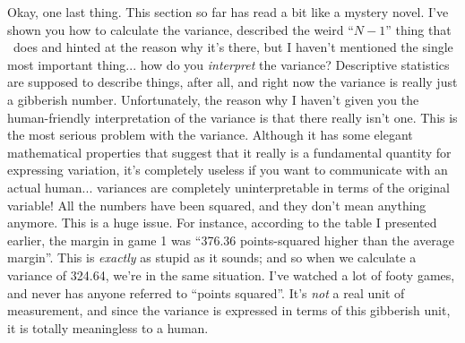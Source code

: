 Okay, one last thing. This section so far has read a bit like a mystery novel. I've shown you how to calculate the variance, described the weird ``$N-1$'' thing that \R\ does and hinted at the reason why it's there, but I haven't mentioned the single most important thing... how do you {\it interpret} the variance? Descriptive statistics are supposed to describe things, after all, and right now the variance is really just a gibberish number. Unfortunately, the reason why I haven't given you the human-friendly interpretation of the variance is that there really isn't one. This is the most serious problem with the variance. Although it has some elegant mathematical properties that suggest that it really is a fundamental quantity for expressing variation, it's completely useless if you want to communicate with an actual human... variances are completely uninterpretable in terms of the original variable! All the numbers have been squared, and they don't mean anything anymore. This is a huge issue. For instance, according to the table I presented earlier, the margin in game 1 was ``376.36 points-squared higher than the average margin''. This is {\it exactly} as stupid as it sounds; and so when we calculate a variance of 324.64, we're in the same situation. I've watched a lot of footy games, and never has anyone referred to ``points squared''. It's {\it not} a real unit of measurement, and since the variance is expressed in terms of this gibberish unit, it is totally meaningless to a human.


